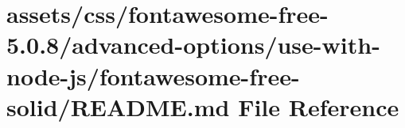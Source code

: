 \hypertarget{css_2fontawesome-free-5_80_88_2advanced-options_2use-with-node-js_2fontawesome-free-solid_2_r_e_a_d_m_e_8md}{}\section{assets/css/fontawesome-\/free-\/5.0.8/advanced-\/options/use-\/with-\/node-\/js/fontawesome-\/free-\/solid/\+R\+E\+A\+D\+ME.md File Reference}
\label{css_2fontawesome-free-5_80_88_2advanced-options_2use-with-node-js_2fontawesome-free-solid_2_r_e_a_d_m_e_8md}
